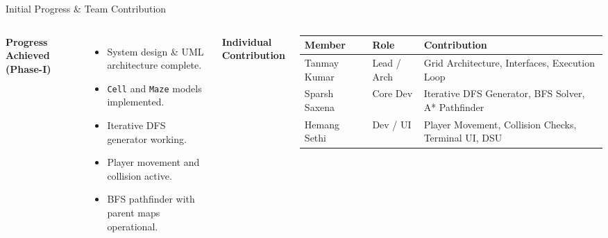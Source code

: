 \documentclass[aspectratio=169,11pt]{beamer}
\begin{document}
\begin{frame}{Initial Progress \& Team Contribution}
\begin{columns}[T,totalwidth=\textwidth]
\textbf{\color{GEUBlue}Progress Achieved (Phase-I)}
\begin{itemize}\itemsep3pt
\item System design \& UML architecture complete.
\item \texttt{Cell} and \texttt{Maze} models implemented.
\item Iterative DFS generator working.
\item Player movement and collision active.
\item BFS pathfinder with parent maps operational.
\end{itemize}
\textbf{\color{GEUBlue}Individual Contribution}
\vspace{2mm}
\scriptsize\renewcommand{\arraystretch}{1.3}
\begin{tabularx}{\textwidth}{@{}R{2.0cm}R{1.8cm}Y@{}}
\toprule
Member & Role & Contribution\\
\midrule
Tanmay Kumar & Lead / Arch & Grid Architecture, Interfaces, Execution Loop\\
Sparsh Saxena & Core Dev & Iterative DFS Generator, BFS Solver, A* Pathfinder\\
Hemang Sethi & Dev / UI & Player Movement, Collision Checks, Terminal UI, DSU\\
\bottomrule
\end{tabularx}
\end{columns}
\end{frame}
\end{document}
